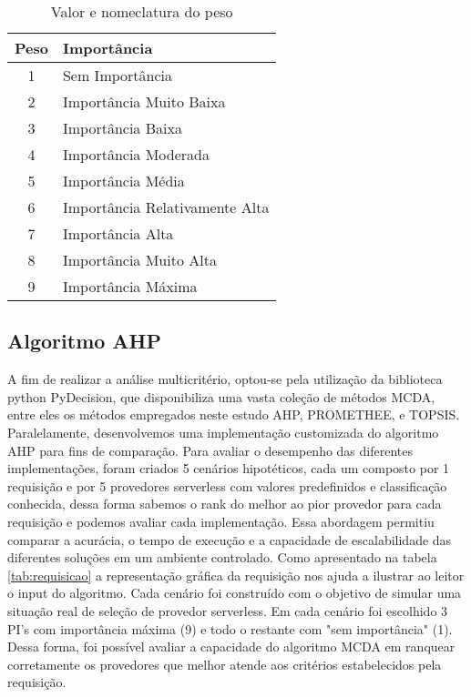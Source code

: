 \documentclass[12pt]{article}[abntex2]
\begin{document}
\begin{table}[ht]
\centering
\begin{adjustbox}{width=0.7\textwidth}
\small
\begin{tabular}{|c|l|}
\hline
\textbf{Peso} & \textbf{Importância} \\
\hline
1 & Sem Importância \\
2 & Importância Muito Baixa \\
3 & Importância Baixa \\
4 & Importância Moderada \\
5 & Importância Média \\
6 & Importância Relativamente Alta \\
7 & Importância Alta \\
8 & Importância Muito Alta \\
9 & Importância Máxima \\
\hline
\end{tabular}
\end{adjustbox}
\caption{Valor e nomeclatura do peso}
\label{tab:peso}
\end{table} 

\subsection{Algoritmo AHP}
A fim de realizar a análise multicritério, optou-se pela utilização da biblioteca python PyDecision, que disponibiliza uma vasta coleção de métodos MCDA, entre eles os métodos empregados neste estudo AHP, PROMETHEE, e TOPSIS. Paralelamente, desenvolvemos uma implementação customizada do algoritmo AHP para fins de comparação. Para avaliar o desempenho das diferentes implementações, foram criados 5 cenários hipotéticos, cada um composto por 1 requisição e por 5 provedores serverless com valores predefinidos e classificação conhecida, dessa forma sabemos o rank do melhor ao pior provedor para cada requisição e podemos avaliar cada implementação. Essa abordagem permitiu comparar a acurácia, o tempo de execução e a capacidade de escalabilidade das diferentes soluções em um ambiente controlado.
Como apresentado na tabela \ref{tab:requisicao} a representação gráfica da requisição nos ajuda a ilustrar ao leitor o input do algoritmo. Cada cenário foi construído com o objetivo de simular uma situação real de seleção de provedor serverless. Em cada cenário foi escolhido 3 PI's com importância máxima (9) e todo o restante com "sem importância" (1). Dessa forma, foi possível avaliar a capacidade do algoritmo MCDA em ranquear corretamente os provedores que melhor atende aos critérios estabelecidos pela requisição.
\end{document}
